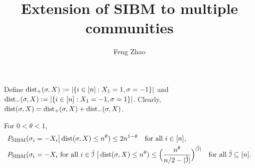 \documentclass{article}
\title{Extension of SIBM to multiple communities}
\author{Feng Zhao}
\begin{document}
\maketitle
Define $\operatorname{dist}_+(\sigma,X):=|\{i\in[n]:X_1=1, \sigma=-1\}|$ and $\operatorname{dist}_-(\sigma,X):=|\{i\in[n]:X_1=-1, \sigma=1\}|$. Clearly, $\operatorname{dist}(\sigma,X)=\operatorname{dist}_+(\sigma,X)+\operatorname{dist}_-(\sigma,X)$.

\begin{lemma} \label{lm:bq}
For $0<\theta<1$,
\begin{align}
& P_{\operatorname{SIBM}}(\sigma_i=-X_i
\big| \operatorname{dist}(\sigma,X) \le n^\theta) \le 2 n^{1-\theta}
\quad \text{for all~} i\in[n] , \label{eq:l1}\\
& P_{\operatorname{SIBM}}(\sigma_i=-X_i \text{~for all~}  i\in\tilde{\mathcal{I}}
~\big| \operatorname{dist}(\sigma,X) \le n^\theta) \le \Big(\frac{n^\theta}{n/2-|\tilde{\mathcal{I}}|}
\Big)^{|\tilde{\mathcal{I}}|}
\quad \text{for all~} \tilde{\mathcal{I}}\subseteq [n] .   \label{eq:l2}
\end{align}
\end{lemma}
\end{document}

